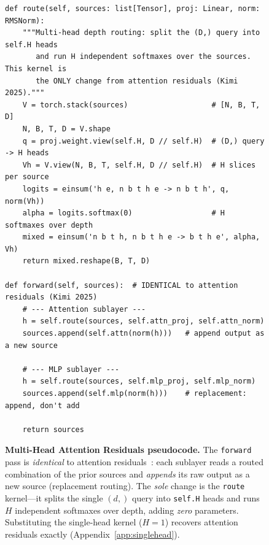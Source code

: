 \documentclass{article}
\begin{document}
\begin{figure}[t]
\begin{lstlisting}[style=mhar]
def route(self, sources: list[Tensor], proj: Linear, norm: RMSNorm):
    """Multi-head depth routing: split the (D,) query into self.H heads
       and run H independent softmaxes over the sources. This kernel is
       the ONLY change from attention residuals (Kimi 2025)."""
    V = torch.stack(sources)                   # [N, B, T, D]
    N, B, T, D = V.shape
    q = proj.weight.view(self.H, D // self.H)  # (D,) query -> H heads
    Vh = V.view(N, B, T, self.H, D // self.H)  # H slices per source
    logits = einsum('h e, n b t h e -> n b t h', q, norm(Vh))
    alpha = logits.softmax(0)                  # H softmaxes over depth
    mixed = einsum('n b t h, n b t h e -> b t h e', alpha, Vh)
    return mixed.reshape(B, T, D)

def forward(self, sources):  # IDENTICAL to attention residuals (Kimi 2025)
    # --- Attention sublayer ---
    h = self.route(sources, self.attn_proj, self.attn_norm)
    sources.append(self.attn(norm(h)))   # append output as a new source

    # --- MLP sublayer ---
    h = self.route(sources, self.mlp_proj, self.mlp_norm)
    sources.append(self.mlp(norm(h)))    # replacement: append, don't add

    return sources
\end{lstlisting}
\caption{\textbf{Multi-Head Attention Residuals pseudocode.} The \texttt{forward} pass is
\emph{identical} to attention residuals~\citep{kimi2025attention}: each sublayer reads a
routed combination of the prior sources and \emph{appends} its raw output as a new source
(replacement routing). The \emph{sole} change is the \texttt{route} kernel---it splits the
single $(d,)$ query into \texttt{self.H} heads and runs $H$ independent softmaxes over
depth, adding \emph{zero} parameters. Substituting the single-head kernel ($H{=}1$)
recovers attention residuals exactly (Appendix~\ref{app:singlehead}).}
\label{fig:code}
\end{figure}
\end{document}
